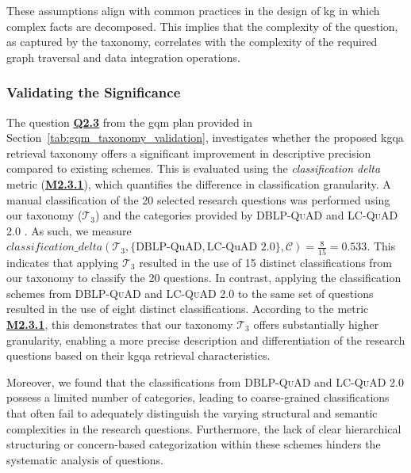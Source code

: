 These assumptions align with common practices in the design of \gls{kg} in which complex facts are decomposed. This implies that the complexity of the question, as captured by the taxonomy, correlates with the complexity of the required graph traversal and data integration operations.

\subsubsection{Validating the Significance}
\begin{sloppypar}
    The question \hyperref[tab:gqm_taxonomy_validation]{\textbf{Q2.3}} from the \gls{gqm} plan provided in Section~\ref{tab:gqm_taxonomy_validation}, investigates whether the proposed \gls{kgqa} retrieval taxonomy offers a significant improvement in descriptive precision compared to existing schemes. This is evaluated using the \emph{classification delta} metric (\hyperref[tab:gqm_taxonomy_validation]{\textbf{M2.3.1}}), which quantifies the difference in classification granularity. A manual classification of the 20 selected research questions was performed using our taxonomy ($\mathcal{T}_3$) and the categories provided by \textsc{DBLP-QuAD} \cite{banerjee_dblp-quad_2023} and \textsc{LC-QuAD 2.0} \cite{dubey_lc-quad_2019}. As such, we measure $classification\_delta(\mathcal{T}_3, \{\text{DBLP-QuAD}, \text{LC-QuAD 2.0}\}, \mathcal{C}) = \frac{8}{15} = 0.533$. This indicates that applying $\mathcal{T}_3$ resulted in the use of 15 distinct classifications from our taxonomy to classify the 20 questions. In contrast, applying the classification schemes from \textsc{DBLP-QuAD} and \textsc{LC-QuAD 2.0} to the same set of questions resulted in the use of eight distinct classifications. According to the metric \hyperref[tab:gqm_taxonomy_validation]{\textbf{M2.3.1}}, this demonstrates that our taxonomy $\mathcal{T}_3$ offers substantially higher granularity, enabling a more precise description and differentiation of the research questions based on their \gls{kgqa} retrieval characteristics.
\end{sloppypar}

Moreover, we found that the classifications from \textsc{DBLP-QuAD} and \textsc{LC-QuAD 2.0} possess a limited number of categories, leading to coarse-grained classifications that often fail to adequately distinguish the varying structural and semantic complexities in the research questions. Furthermore, the lack of clear hierarchical structuring or concern-based categorization within these schemes hinders the systematic analysis of questions.

